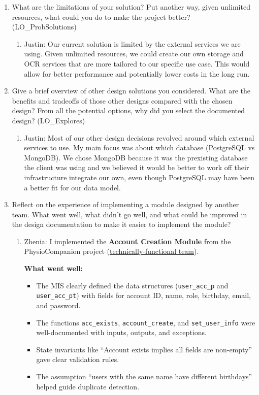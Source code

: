 \documentclass[12pt, titlepage]{article}
\begin{document}
\begin{enumerate}
\begin{enumerate}
  \end{enumerate}
  \item What are the limitations of your solution?  Put another way, given
  unlimited resources, what could you do to make the project better? (LO\_ProbSolutions)
  \begin{enumerate}
    \item Justin: Our current solution is limited by the external services we are using. Given unlimited resources, we could create our own storage and OCR services that are more tailored to our specific use case. This would allow for better performance and potentially lower costs in the long run.
  \end{enumerate}
  \item Give a brief overview of other design solutions you considered.  What
  are the benefits and tradeoffs of those other designs compared with the chosen
  design?  From all the potential options, why did you select the documented design?
  (LO\_Explores)
  \begin{enumerate}
    \item Justin: Most of our other design decisions revolved around which external services to use. My main focus was about which database (PostgreSQL vs MongoDB). We chose MongoDB because it was the prexisting database the client was using and we believed it would be better to work off their infrastructure integrate our own, even though PostgreSQL may have been a better fit for our data model.
  \end{enumerate}
  \item Reflect on the experience of implementing a module designed by another team. What went well, what didn't go well, and what could be improved in the design documentation to make it easier to implement the module?
  \begin{enumerate}
    \item Zhenia: I implemented the \textbf{Account Creation Module} from the PhysioCompanion project (\href{https://github.com/M9Huynh/technically-functional}{technically-functional team}).

    \textbf{What went well:}
    \begin{itemize}
      \item The MIS clearly defined the data structures (\texttt{user\_acc\_p} and \texttt{user\_acc\_pt}) with fields for account ID, name, role, birthday, email, and password.
      \item The functions \texttt{acc\_exists}, \texttt{account\_create}, and \texttt{set\_user\_info} were well-documented with inputs, outputs, and exceptions.
      \item State invariants like ``Account exists implies all fields are non-empty'' gave clear validation rules.
      \item The assumption ``users with the same name have different birthdays'' helped guide duplicate detection.
    \end{itemize}


\end{enumerate}
\end{enumerate}
\end{document}
